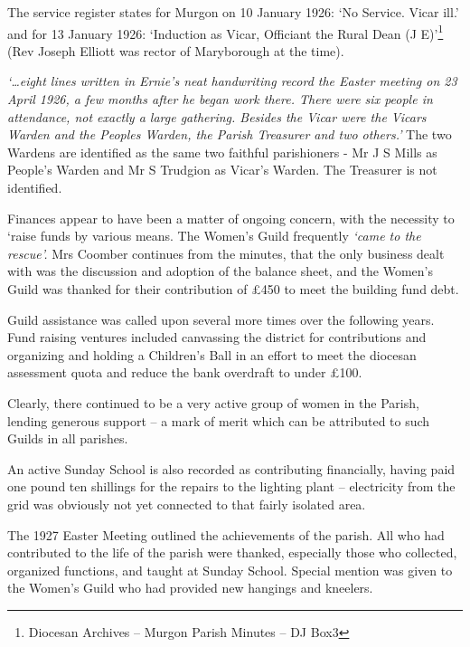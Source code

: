 The service register states for Murgon on 10 January 1926: `No Service. Vicar ill.' and for 13 January 1926: `Induction as Vicar, Officiant the Rural Dean (J E)'\footnote{Diocesan Archives -- Murgon Parish Minutes -- DJ Box3} (Rev Joseph Elliott was rector of Maryborough at the time).


\emph{`\ldots eight lines written in Ernie's neat handwriting record the Easter meeting on 23 April 1926, a few months after he began work there. There were six people in attendance, not exactly a large gathering. Besides the Vicar were the Vicars Warden and the Peoples Warden, the Parish Treasurer and two others.'} The two Wardens are identified as the same two faithful parishioners - Mr J S Mills as People's Warden and Mr S Trudgion as Vicar's Warden. The Treasurer is not identified.



Finances appear to have been a matter of ongoing concern, with the necessity to `raise funds by various means. The Women's Guild frequently \emph{`came to the rescue'.} Mrs Coomber continues from the minutes, that the only business dealt with was the discussion and adoption of the balance sheet, and the Women's Guild was thanked for their contribution of \pounds450 to meet the building fund debt.



Guild assistance was called upon several more times over the following years. Fund raising ventures included canvassing the district for contributions and organizing and holding a Children's Ball in an effort to meet the diocesan assessment quota and reduce the bank overdraft to under \pounds100.



Clearly, there continued to be a very active group of women in the Parish, lending generous support -- a mark of merit which can be attributed to such Guilds in all parishes.



An active Sunday School is also recorded as contributing financially, having paid one pound ten shillings for the repairs to the lighting plant -- electricity from the grid was obviously not yet connected to that fairly isolated area.



The 1927 Easter Meeting outlined the achievements of the parish. All who had contributed to the life of the parish were thanked, especially those who collected, organized functions, and taught at Sunday School. Special mention was given to the Women's Guild who had provided new hangings and kneelers.



